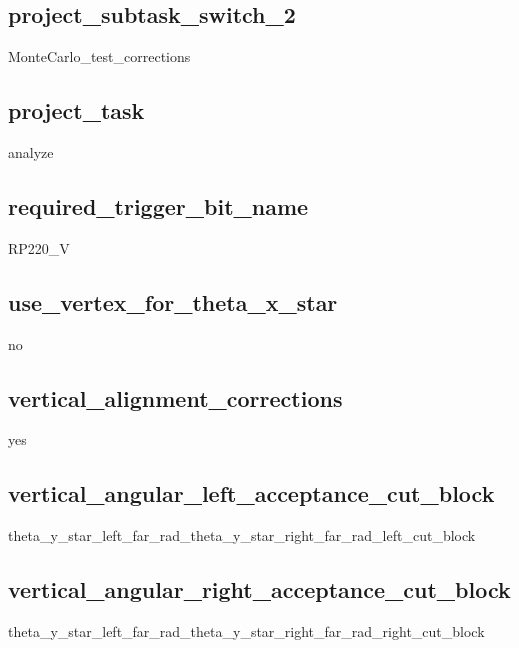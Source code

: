 \documentclass{article}
\begin{document}
\begin{landscape}
\subsection{project\_subtask\_switch\_2}
MonteCarlo\_test\_corrections \newline
\subsection{project\_task}
analyze \newline
\subsection{required\_trigger\_bit\_name}
RP220\_V \newline
\subsection{use\_vertex\_for\_theta\_x\_star}
no \newline
\subsection{vertical\_alignment\_corrections}
yes \newline
\subsection{vertical\_angular\_left\_acceptance\_cut\_block}
theta\_y\_star\_left\_far\_rad\_theta\_y\_star\_right\_far\_rad\_left\_cut\_block \newline
\subsection{vertical\_angular\_right\_acceptance\_cut\_block}
theta\_y\_star\_left\_far\_rad\_theta\_y\_star\_right\_far\_rad\_right\_cut\_block \newline

\end{landscape}
\end{document}
